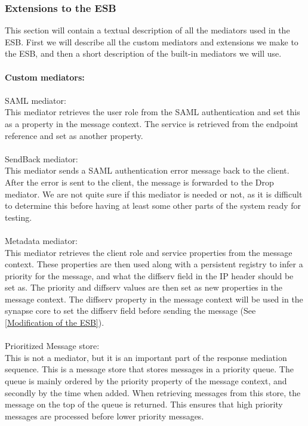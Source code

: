     \subsubsection{Extensions to the ESB}\label{Extensions to the ESB} 
    This section will contain a textual description of all the mediators used in the ESB. First we will describe all the custom mediators and extensions we make to the ESB, and then a short description of the built-in mediators we will use.
\\\\
\textbf{Custom mediators:}\\\\
SAML mediator:\\
    This mediator retrieves the user role from the SAML authentication and set this as a property in the message context. The service is retrieved from the endpoint reference and set as another property.
\\\\
SendBack mediator:\\
    This mediator sends a SAML authentication error message back to the client. After the error is sent to the client, the message is forwarded to the Drop mediator. We are not quite sure if this mediator is needed or not, as it is difficult to determine this before having at least some other parts of the system ready for testing.
\\\\
Metadata mediator:\\
    This mediator retrieves the client role and service properties from the message context. These properties are then used along with a persistent registry to infer a priority for the message, and what the diffserv field in the IP header should be set as. The priority and diffserv values are then set as new properties in the message context.
    The diffserv property in the message context will be used in the synapse core to set the diffserv field before sending the message (See \ref{Modification of the ESB}).
\\\\
Prioritized Message store:\\
    This is not a mediator, but it is an important part of the response mediation sequence. This is a message store that stores messages in a priority queue. The queue is mainly ordered by the priority property of the message context, and secondly by the time when added. When retrieving messages from this store, the message on the top of the queue is returned. This ensures that high priority messages are processed before lower priority messages.
